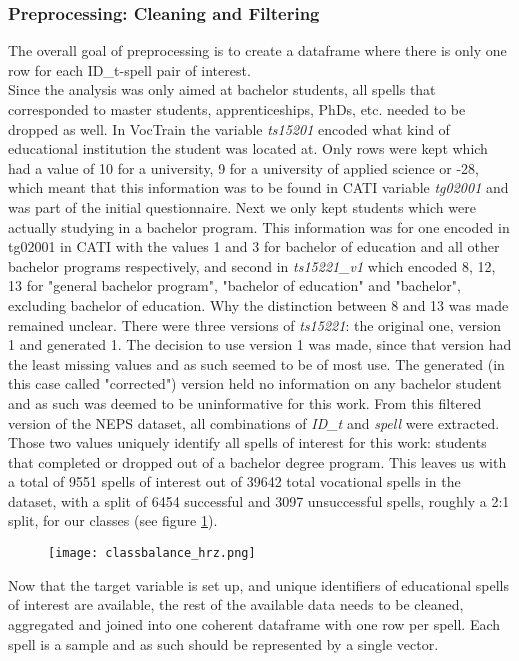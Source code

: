 \subsubsection{Preprocessing: Cleaning and Filtering}
The overall goal of preprocessing is to create a dataframe where there is only one row for each ID\_t-spell pair of interest.\\
Since the analysis was only aimed at bachelor students, all spells that corresponded to master students, apprenticeships, PhDs, etc. needed to be dropped as well. In VocTrain the variable \textit{ts15201} encoded what kind of educational institution the student was located at. Only rows were kept which had a value of 10 for a university, 9 for a university of applied science or -28, which meant that this information was to be found in CATI variable \textit{tg02001} and was part of the initial questionnaire. Next we only kept students which were actually studying in a bachelor program. This information was for one encoded in tg02001 in CATI with the values 1 and 3 for bachelor of education and all other bachelor programs respectively, and second in \textit{ts15221\_v1} which encoded 8, 12, 13 for "general bachelor program", "bachelor of education" and "bachelor", excluding bachelor of education. Why the distinction between 8 and 13 was made remained unclear. There were three versions of \textit{ts15221}: the original one, version 1 and generated 1. The decision to use version 1 was made, since that version had the least missing values and as such seemed to be of most use. The generated (in this case called "corrected") version held no information on any bachelor student and as such was deemed to be uninformative for this work. From this filtered version of the NEPS dataset, all combinations of \textit{ID\_t} and \textit{spell} were extracted. Those two values uniquely identify all spells of interest for this work: students that completed or dropped out of a bachelor degree program. This leaves us with a total of 9551 spells of interest out of 39642 total vocational spells in the dataset, with a split of 6454 successful and 3097 unsuccessful spells, roughly a 2:1 split, for our classes (see figure \ref{fig:classbalance}).
\begin{figure}[ht]%
    \texttt{[image: classbalance\_hrz.png]}
    \label{fig:classbalance}
\end{figure}
Now that the target variable is set up, and unique identifiers of educational spells of interest are available, the rest of the available data needs to be cleaned, aggregated and joined into one coherent dataframe with one row per spell. Each spell is a sample and as such should be represented by a single vector.

